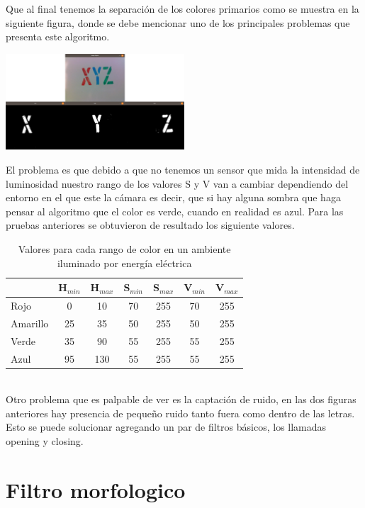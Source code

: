 Que al final tenemos la separación de los colores primarios como se muestra en la siguiente
figura, donde se debe mencionar uno de los principales problemas que presenta este algoritmo.
\begin{center}
	\includegraphics[width=0.5\textwidth]{Contenido/Cuerpo/Capitulo4/Fig8.eps}
	\label{Fig9}
\end{center}
El problema es que debido a que no tenemos un sensor que mida la intensidad de luminosidad
nuestro rango de los valores S y V van a cambiar dependiendo del entorno en el que este la cámara
es decir, que si hay alguna sombra que haga pensar al algoritmo que el color es verde, cuando en
realidad es azul.
Para las pruebas anteriores se obtuvieron de resultado los siguiente valores.\\
\begin{table}[ht]
	\begin{center}
		\caption{Valores para cada rango de color en un ambiente iluminado por energía eléctrica}
		\begin{tabular}[t]{lcccccc}
			\hline
			         & H$_{min}$ & H$_{max}$ & S$_{min}$ & S$_{max}$ & V$_{min}$ & V$_{max}$ \\
			\hline
			Rojo     & 0         & 10        & 70        & 255       & 70        & 255       \\
			Amarillo & 25        & 35        & 50        & 255       & 50        & 255       \\
			Verde    & 35        & 90        & 55        & 255       & 55        & 255       \\
			Azul     & 95        & 130       & 55        & 255       & 55        & 255       \\
			\hline
		\end{tabular}
	\end{center}
\end{table}\\
Otro problema que es palpable de ver es la captación de ruido, en las dos figuras anteriores
hay presencia de pequeño ruido tanto fuera como dentro de las letras. Esto se puede solucionar
agregando un par de filtros básicos, los llamadas opening y closing.



\section{Filtro morfologico}